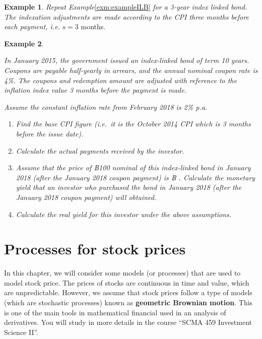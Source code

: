\documentclass[
]{book}
\theoremstyle{definition}
\theoremstyle{definition}
\newtheorem{example}{Example}[chapter]
\theoremstyle{definition}
\theoremstyle{definition}
\theoremstyle{remark}
\begin{document}
\begin{example}
\emph{Repeat Example}\ref{exm:exampleILB} \emph{for a 3-year index linked bond.
The indexation adjustments are made according to the CPI three months
before each payment, i.e.} \(s = 3\) months.
\end{example}

\begin{example}
\protect\hypertarget{exm:exampleILB2}{}\label{exm:exampleILB2}

\emph{In January 2015, the government issued an index-linked bond of term 10
years. Coupons are payable half-yearly in arrears, and the annual
nominal coupon rate is 4\%. The coupons and redemption amount are
adjusted with reference to the inflation index value 3 months before the
payment is made.}

\emph{Assume the constant inflation rate from February 2018 is 2\% p.a.}

\begin{enumerate}
\def\labelenumi{\arabic{enumi}.}
\item
  \emph{Find the base CPI figure (i.e.~it is the October 2014 CPI which is
  3 months before the issue date).}
\item
  \emph{Calculate the actual payments received by the investor.}
\item
  \emph{Assume that the price of ฿100 nominal of this index-linked bond in
  January 2018 (after the January 2018 coupon payment) is ฿ .
  Calculate the monetary yield that an investor who purchased the bond
  in January 2018 (after the January 2018 coupon payment) will
  obtained.}
\item
  \emph{Calculate the real yield for this investor under the above
  assumptions.}
\end{enumerate}

\end{example}

\hypertarget{processes-for-stock-prices}{%
\chapter{Processes for stock prices}\label{processes-for-stock-prices}}

In this chapter, we will consider some models (or processes) that are
used to model stock price. The prices of stocks are continuous in time
and value, which are unpredictable. However, we assume that stock prices
follow a type of models (which are stochastic processes) known as
\textbf{geometric Brownian motion}. This is one of the main tools in
mathematical financial used in an analysis of derivatives. You will
study in more details in the course ``SCMA 459 Investment Science II''.
\end{document}
